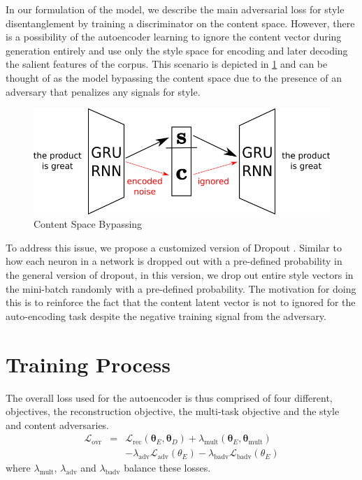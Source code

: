 In our formulation of the model, we describe the main adversarial loss for style disentanglement by training a discriminator on the content space. However, there is a possibility of the autoencoder learning to ignore the content vector during generation entirely and use only the style space for encoding and later decoding the salient features of the corpus. This scenario is depicted in \ref{fig:model-content-bypass} and can be thought of as the model bypassing the content space due to the presence of an adversary that penalizes any signals for style.

\begin{figure}[ht]
	\centering
	\includegraphics[width=\linewidth]{images/model-content-bypass}
	\caption{Content Space Bypassing}
	\label{fig:model-content-bypass}
\end{figure}

To address this issue, we propose a customized version of Dropout \cite{srivastava2014dropout}. Similar to how each neuron in a network is dropped out with a pre-defined probability in the general version of dropout, in this version, we drop out entire style vectors in the mini-batch randomly with a pre-defined probability. The motivation for doing this is to reinforce the fact that the content latent vector is not to ignored for the auto-encoding task despite the negative training signal from the adversary.


\section{Training Process}

The overall loss used for the autoencoder is thus comprised of four different, objectives, the reconstruction objective, the multi-task objective and the style and content adversaries.
\begin{eqnarray*}
	\mathcal{L}_\text{ovr} &=&
	\mathcal{L}_\text{rec}(\bm\theta_E, \bm\theta_D)
	+ \lambda_\text{mult}(\bm\theta_E,\bm\theta_\text{mult}) \\ & &
	- \lambda_\text{adv} \mathcal{L}_\text{adv}(\theta_E)
	- \lambda_\text{badv} \mathcal{L}_\text{badv}(\theta_E)
\end{eqnarray*}
where $\lambda_\text{mult}$, $\lambda_\text{adv}$ and $\lambda_\text{badv}$ balance these losses.


